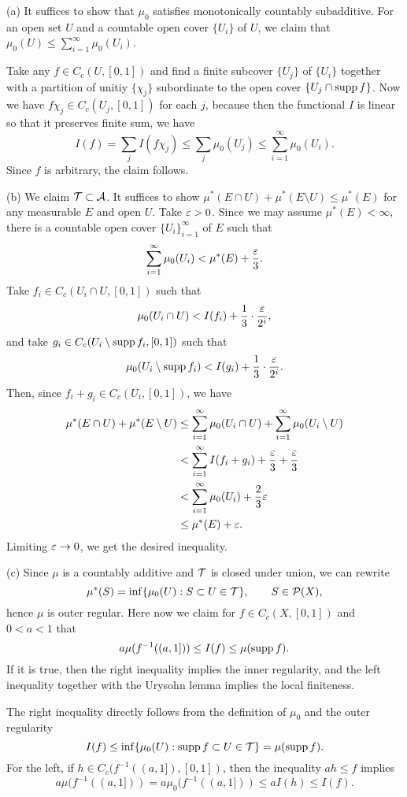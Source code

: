 \documentclass{../../large}
\begin{document}
\begin{pf}
(a)
It suffices to show that $\mu_0$ satisfies monotonically countably subadditive.
For an open set $U$ and a countable open cover $\{U_i\}$ of $U$, we claim that $\mu_0(U)\le\sum_{i=1}^\infty\mu_0(U_i)$.

Take any $f\in C_c(U,[0,1])$ and find a finite subcover $\{U_j\}$ of $\{U_i\}$ together with a partition of unitiy $\{\chi_j\}$ subordinate to the open cover $\{U_j\cap\operatorname{supp} f\}$.
Now we have $f\chi_j\in C_c(U_j,[0,1])$ for each $j$, because then the functional $I$ is linear so that it preserves finite sum, we have
\[I(f)=\sum_j I(f\chi_j)\le\sum_j\mu_0(U_j)\le\sum_{i=1}^\infty\mu_0(U_i).\]
Since $f$ is arbitrary, the claim follows.

(b)
We claim $\mathcal{T}\subset\mathcal{A}$.
It suffices to show $\mu^*(E\cap U)+\mu^*(E\setminus U)\le\mu^*(E)$ for any measurable $E$ and open $U$.
Take $\varepsilon>0$.
Since we may assume $\mu^*(E)<\infty$, there is a countable open cover $\{U_i\}_{i=1}^\infty$ of $E$ such that
\[\sum_{i=1}^\infty\mu_0(U_i)<\mu^*(E)+\frac{\varepsilon}3.\]
Take $f_i\in C_c(U_i\cap U,[0,1])$ such that
\[\mu_0(U_i\cap U)<I(f_i)+\frac13\cdot\frac{\varepsilon}{2^i},\]
and take $g_i\in C_c(U_i\setminus\operatorname{supp} f_i,[0,1])$ such that
\[\mu_0(U_i\setminus\operatorname{supp} f_i)<I(g_i)+\frac13\cdot\frac{\varepsilon}{2^i}.\]
Then, since $f_i+g_i\in C_c(U_i,[0,1])$, we have
\begin{align*}
\mu^*(E\cap U)+\mu^*(E\setminus U)
&\le\sum_{i=1}^\infty\mu_0(U_i\cap U)+\sum_{i=1}^\infty\mu_0(U_i\setminus U)\\
&<\sum_{i=1}^\infty I(f_i+g_i)+\frac{\varepsilon}3+\frac{\varepsilon}3\\
&<\sum_{i=1}^\infty\mu_0(U_i)+\frac23\varepsilon\\
&\le\mu^*(E)+\varepsilon.
\end{align*}
Limiting $\varepsilon\to0$, we get the desired inequality.

(c)
Since $\mu$ is a countably additive and $\mathcal{T}$ is closed under union, we can rewrite
\[\mu^*(S)=\inf\{\mu_0(U):S\subset U\in\mathcal{T}\},\qquad S\in\mathcal{P}(X),\]
hence $\mu$ is outer regular.
Here now we claim for $f\in C_c(X,[0,1])$ and $0<a<1$ that
\[a\mu(f^{-1}((a,1]))\le I(f)\le\mu(\operatorname{supp} f).\]
If it is true, then the right inequality implies the inner regularity, and the left inequality together with the Urysohn lemma implies the local finiteness.

The right inequality directly follows from the definition of $\mu_0$ and the outer regularity
\[I(f)\le\inf\{\mu_0(U):\operatorname{supp} f\subset U\in\mathcal{T}\}=\mu(\operatorname{supp} f).\]
For the left, if $h\in C_c(f^{-1}((a,1]),[0,1])$, then the inequality $ah\le f$ implies
\[a\mu(f^{-1}((a,1]))=a\mu_0(f^{-1}((a,1]))\le aI(h)\le I(f).\]


\end{pf}
\end{document}
